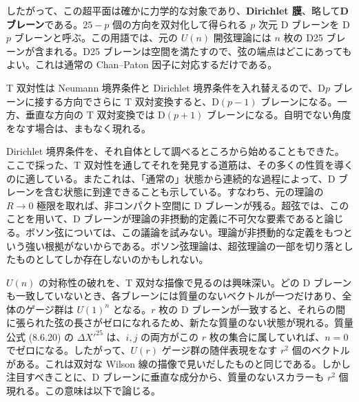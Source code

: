 したがって、この超平面は確かに力学的な対象であり、\textbf{Dirichlet 膜}、略して\textbf{D ブレーン}である。$25-p$ 個の方向を双対化して得られる $p$ 次元 D ブレーンを D$p$ ブレーンと呼ぶ。この用語では、元の $U(n)$ 開弦理論には $n$ 枚の D25 ブレーンが含まれる。D25 ブレーンは空間を満たすので、弦の端点はどこにあってもよい。これは通常の Chan--Paton 因子に対応するだけである。

T 双対性は Neumann 境界条件と Dirichlet 境界条件を入れ替えるので、D$p$ ブレーンに接する方向でさらに T 双対変換すると、D$(p-1)$ ブレーンになる。一方、垂直な方向の T 双対変換では D$(p+1)$ ブレーンになる。自明でない角度をなす場合は、まもなく現れる。

Dirichlet 境界条件を、それ自体として調べるところから始めることもできた。ここで採った、T 双対性を通してそれを発見する道筋は、その多くの性質を導くのに適している。またこれは、「通常の」状態から連続的な過程によって、D ブレーンを含む状態に到達できることも示している。すなわち、元の理論の $R\to0$ 極限を取れば、非コンパクト空間に D ブレーンが残る。超弦では、このことを用いて、D ブレーンが理論の非摂動的定義に不可欠な要素であると論じる。ボソン弦については、この議論を試みない。理論が非摂動的な定義をもつという強い根拠がないからである。ボソン弦理論は、超弦理論の一部を切り落としたものとしてしか存在しないのかもしれない。

$U(n)$ の対称性の破れを、T 双対な描像で見るのは興味深い。どの D ブレーンも一致していないとき、各ブレーンには質量のないベクトルが一つだけあり、全体のゲージ群は $U(1)^n$ となる。$r$ 枚の D ブレーンが一致すると、それらの間に張られた弦の長さがゼロになれるため、新たな質量のない状態が現れる。質量公式 (8.6.20) の $\Delta X'^{25}$ は、$i,j$ の両方がこの $r$ 枚の集合に属していれば、$n=0$ でゼロになる。したがって、$U(r)$ ゲージ群の随伴表現をなす $r^2$ 個のベクトルがある。これは双対な Wilson 線の描像で見いだしたものと同じである。しかし注目すべきことに、D ブレーンに垂直な成分から、質量のないスカラーも $r^2$ 個現れる。この意味は以下で論じる。


